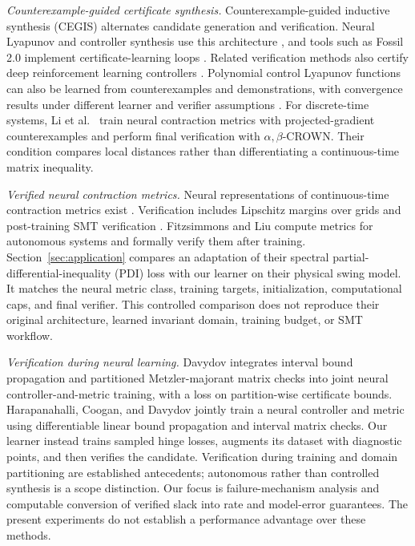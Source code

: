 \documentclass[12pt,onecolumn,journal]{IEEEtran}
\begin{document}
\noindent\textit{Counterexample-guided certificate synthesis.} Counterexample-guided inductive synthesis (CEGIS) \cite{solar2006} alternates candidate generation and verification. Neural Lyapunov and controller synthesis use this architecture \cite{chang2019,abate2021}, and tools such as Fossil 2.0 implement certificate-learning loops \cite{edwards2024}. Related verification methods also certify deep reinforcement learning controllers \cite{mandal2024}. Polynomial control Lyapunov functions can also be learned from counterexamples and demonstrations, with convergence results under different learner and verifier assumptions \cite{ravanbakhsh2019}. For discrete-time systems, Li et al.\ \cite{li2025} train neural contraction metrics with projected-gradient counterexamples and perform final verification with $\alpha,\beta$-CROWN. Their condition compares local distances rather than differentiating a continuous-time matrix inequality.

\noindent\textit{Verified neural contraction metrics.} Neural representations of continuous-time contraction metrics exist \cite{tsukamoto2021ncm,sun2021}. Verification includes Lipschitz margins over grids \cite{sun2021} and post-training SMT verification \cite{fitzsimmons2024}. Fitzsimmons and Liu \cite{fitzsimmons2024} compute metrics for autonomous systems and formally verify them after training. Section~\ref{sec:application} compares an adaptation of their spectral partial-differential-inequality (PDI) loss with our learner on their physical swing model. It matches the neural metric class, training targets, initialization, computational caps, and final verifier. This controlled comparison does not reproduce their original architecture, learned invariant domain, training budget, or SMT workflow.

\noindent\textit{Verification during neural learning.} Davydov \cite{davydov2025partitioning} integrates interval bound propagation and partitioned Metzler-majorant matrix checks into joint neural controller-and-metric training, with a loss on partition-wise certificate bounds. Harapanahalli, Coogan, and Davydov \cite{harapanahalli2026} jointly train a neural controller and metric using differentiable linear bound propagation and interval matrix checks. Our learner instead trains sampled hinge losses, augments its dataset with diagnostic points, and then verifies the candidate. Verification during training and domain partitioning are established antecedents; autonomous rather than controlled synthesis is a scope distinction. Our focus is failure-mechanism analysis and computable conversion of verified slack into rate and model-error guarantees. The present experiments do not establish a performance advantage over these methods.
\end{document}
